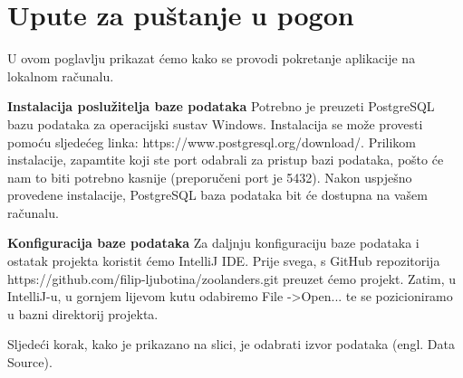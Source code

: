 			\eject 
		
		\section{Upute za puštanje u pogon}
		
			U ovom poglavlju prikazat ćemo kako se provodi pokretanje aplikacije na lokalnom računalu.
			
			\textbf{Instalacija poslužitelja baze podataka}
			Potrebno je preuzeti PostgreSQL bazu podataka za operacijski sustav Windows. Instalacija se može provesti pomoću sljedećeg linka: https://www.postgresql.org/download/. Prilikom instalacije, zapamtite koji ste port odabrali za pristup bazi podataka, pošto će nam to biti potrebno kasnije (preporučeni port je 5432). Nakon uspješno provedene instalacije, PostgreSQL baza podataka bit će dostupna na vašem računalu.
			
			\textbf{Konfiguracija baze podataka}
			Za daljnju konfiguraciju baze podataka i ostatak projekta koristit ćemo IntelliJ IDE. Prije svega, s GitHub repozitorija https://github.com/filip-ljubotina/zoolanders.git preuzet ćemo projekt. Zatim, u IntelliJ-u, u gornjem lijevom kutu odabiremo File -\textgreater Open... te se pozicioniramo u bazni direktorij projekta.
			
			Sljedeći korak, kako je prikazano na slici, je odabrati izvor podataka (engl. Data Source).
			
